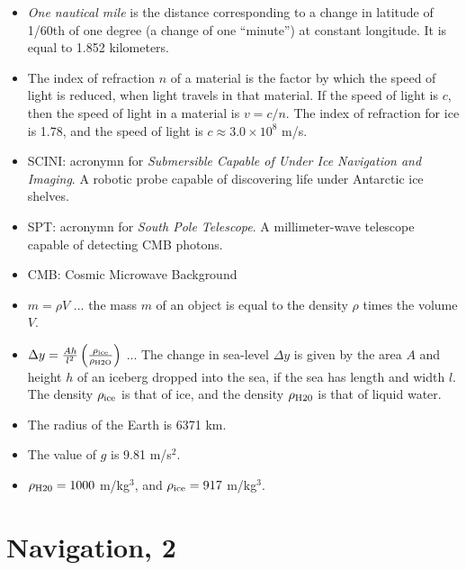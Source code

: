 \documentclass[10pt]{article}
\begin{document}
\begin{itemize}
\item \textit{One nautical mile} is the distance corresponding to a change in latitude of 1/60th of one degree (a change of one ``minute'') at constant longitude.  It is equal to 1.852 kilometers.
\item The index of refraction $n$ of a material is the factor by which the speed of light is reduced, when light travels in that material.  If the speed of light is $c$, then the speed of light in a material is $v = c/n$.  The index of refraction for ice is 1.78, and the speed of light is $c \approx 3.0 \times 10^{8}$ m/s.
\item SCINI: acronymn for \textit{Submersible Capable of Under Ice Navigation and Imaging}.  A robotic probe capable of discovering life under Antarctic ice shelves.
\item SPT: acronymn for \textit{South Pole Telescope}.  A millimeter-wave telescope capable of detecting CMB photons.
\item CMB: Cosmic Microwave Background
\item $m = \rho V$ ... the mass $m$ of an object is equal to the density $\rho$ times the volume $V$.
\item $\Delta y = \frac{Ah}{l^2}\left(\frac{\rho_{\rm ice}}{\rho_{\rm H2O}}\right)$ ... The change in sea-level $\Delta y$ is given by the area $A$ and height $h$ of an iceberg dropped into the sea, if the sea has length and width $l$.  The density $\rho_{\rm ice}$ is that of ice, and the density $\rho_{\rm H20}$ is that of liquid water.
\item The radius of the Earth is 6371 km.
\item The value of $g$ is 9.81 m/s$^2$.
\item $\rho_{\rm H20} = 1000$ m/kg$^3$, and $\rho_{\rm ice} = 917$ m/kg$^3$.
\end{itemize}

\clearpage

\section{Navigation, 2}
\end{document}
